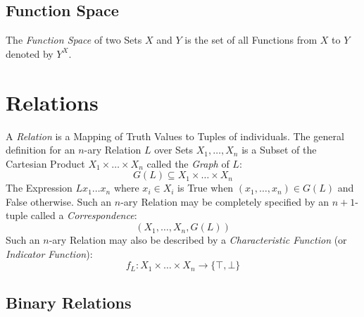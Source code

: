 \documentclass{article}
\begin{document}
\subsection{Function Space}\label{subsec:function_space}

The \emph{Function Space} of two Sets $X$ and $Y$ is the set of all
Functions from $X$ to $Y$ denoted by $Y^X$.

\section{Relations}\label{sec:set_relations}

A \emph{Relation} is a Mapping of Truth Values to Tuples of
individuals. The general definition for an $n$-ary Relation $L$ over
Sets $X_1, \ldots, X_n$ is a Subset of the Cartesian Product $X_1
\times \ldots \times X_n$ called the \emph{Graph} of $L$:
\[
    G(L) \subseteq X_1 \times \ldots \times X_n
\]
The Expression $L x_1 \ldots x_n$ where $x_i \in X_i$ is True when
$(x_1, \ldots, x_n) \in G(L)$ and False otherwise. Such an $n$-ary
Relation may be completely specified by an $n + 1$-tuple called a
\emph{Correspondence}:
\[
    (X_1, \ldots, X_n, G(L))
\]
Such an $n$-ary Relation may also be described by a
\emph{Characteristic Function} (or \emph{Indicator Function}): %
\[
    f_L : X_1 \times \ldots \times X_n \rightarrow \{\top,\bot\}
\]

\subsection{Binary Relations}\label{subsec:binary_relations}
\end{document}

